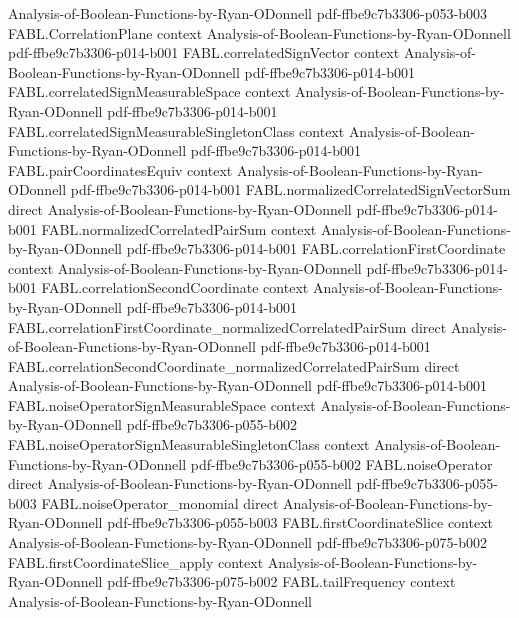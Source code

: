 \begin{theorem}
  {Analysis-of-Boolean-Functions-by-Ryan-ODonnell}
  {pdf-ffbe9c7b3306-p053-b003}
\proofstep
  {FABL.CorrelationPlane}
  {context}
  {Analysis-of-Boolean-Functions-by-Ryan-ODonnell}
  {pdf-ffbe9c7b3306-p014-b001}
\proofstep
  {FABL.correlatedSignVector}
  {context}
  {Analysis-of-Boolean-Functions-by-Ryan-ODonnell}
  {pdf-ffbe9c7b3306-p014-b001}
\proofstep
  {FABL.correlatedSignMeasurableSpace}
  {context}
  {Analysis-of-Boolean-Functions-by-Ryan-ODonnell}
  {pdf-ffbe9c7b3306-p014-b001}
\proofstep
  {FABL.correlatedSignMeasurableSingletonClass}
  {context}
  {Analysis-of-Boolean-Functions-by-Ryan-ODonnell}
  {pdf-ffbe9c7b3306-p014-b001}
\proofstep
  {FABL.pairCoordinatesEquiv}
  {context}
  {Analysis-of-Boolean-Functions-by-Ryan-ODonnell}
  {pdf-ffbe9c7b3306-p014-b001}
\proofstep
  {FABL.normalizedCorrelatedSignVectorSum}
  {direct}
  {Analysis-of-Boolean-Functions-by-Ryan-ODonnell}
  {pdf-ffbe9c7b3306-p014-b001}
\proofstep
  {FABL.normalizedCorrelatedPairSum}
  {context}
  {Analysis-of-Boolean-Functions-by-Ryan-ODonnell}
  {pdf-ffbe9c7b3306-p014-b001}
\proofstep
  {FABL.correlationFirstCoordinate}
  {context}
  {Analysis-of-Boolean-Functions-by-Ryan-ODonnell}
  {pdf-ffbe9c7b3306-p014-b001}
\proofstep
  {FABL.correlationSecondCoordinate}
  {context}
  {Analysis-of-Boolean-Functions-by-Ryan-ODonnell}
  {pdf-ffbe9c7b3306-p014-b001}
\proofstep
  {FABL.correlationFirstCoordinate_normalizedCorrelatedPairSum}
  {direct}
  {Analysis-of-Boolean-Functions-by-Ryan-ODonnell}
  {pdf-ffbe9c7b3306-p014-b001}
\proofstep
  {FABL.correlationSecondCoordinate_normalizedCorrelatedPairSum}
  {direct}
  {Analysis-of-Boolean-Functions-by-Ryan-ODonnell}
  {pdf-ffbe9c7b3306-p014-b001}
\proofstep
  {FABL.noiseOperatorSignMeasurableSpace}
  {context}
  {Analysis-of-Boolean-Functions-by-Ryan-ODonnell}
  {pdf-ffbe9c7b3306-p055-b002}
\proofstep
  {FABL.noiseOperatorSignMeasurableSingletonClass}
  {context}
  {Analysis-of-Boolean-Functions-by-Ryan-ODonnell}
  {pdf-ffbe9c7b3306-p055-b002}
\proofstep
  {FABL.noiseOperator}
  {direct}
  {Analysis-of-Boolean-Functions-by-Ryan-ODonnell}
  {pdf-ffbe9c7b3306-p055-b003}
\proofstep
  {FABL.noiseOperator_monomial}
  {direct}
  {Analysis-of-Boolean-Functions-by-Ryan-ODonnell}
  {pdf-ffbe9c7b3306-p055-b003}
\proofstep
  {FABL.firstCoordinateSlice}
  {context}
  {Analysis-of-Boolean-Functions-by-Ryan-ODonnell}
  {pdf-ffbe9c7b3306-p075-b002}
\proofstep
  {FABL.firstCoordinateSlice_apply}
  {context}
  {Analysis-of-Boolean-Functions-by-Ryan-ODonnell}
  {pdf-ffbe9c7b3306-p075-b002}
\proofstep
  {FABL.tailFrequency}
  {context}
  {Analysis-of-Boolean-Functions-by-Ryan-ODonnell}

\end{theorem}
